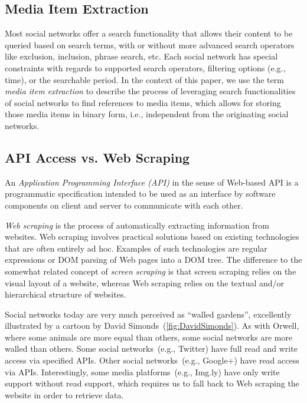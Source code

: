 \documentclass{acm_proc_article-sp}
\let\oldemph\emph
\renewcommand{\emph}[1]{\oldemph{\fontsize{9}{9}\selectfont #1}}
\begin{document}
\subsection{Media Item Extraction}
Most social networks offer a search functionality that allows their content to be queried based on search terms,
with or without more advanced search operators like exclusion, inclusion, phrase search, etc.
Each social network has special constraints with regards to supported search operators,
filtering options (e.g., time), or the searchable period.
In the context of this paper, we use the term \emph{media item extraction} to describe the process of leveraging search functionalities of social networks to find references to media items,
which allows for storing those media items in binary form,
i.e., independent from the originating social networks.

\subsection{API Access vs. Web Scraping}
An \emph{Application Programming Interface (API)} in the sense of Web-based API is a programmatic specification intended to be used as an interface by software components on client and server to communicate with each other.

\emph{Web scraping} is the process of automatically extracting information from websites.
Web scraping involves practical solutions based on existing technologies that are often entirely ad hoc.
Examples of such technologies are regular expressions or DOM parsing of Web pages into a DOM tree.
The difference to the somewhat related concept of \emph{screen scraping} is that screen scraping relies on the visual layout of a website, whereas Web scraping relies on the textual and/or hierarchical structure of websites.

Social networks today are very much perceived as ``walled gardens'', excellently illustrated by a cartoon by David Simonds~(\autoref{fig:DavidSimonds}).
As with Orwell, where some animals are more equal than others, some social networks are more walled than others.
Some social networks~(e.g., Twitter) have full read and write access via specified APIs.
Other social networks~(e.g., Google+) have read access via APIs.
Interestingly, some media platforms~(e.g., Img.ly) have only write support without read support, which requires us to fall back to Web scraping the website in order to retrieve data.
\end{document}
